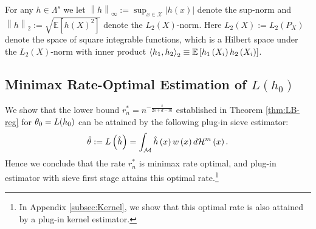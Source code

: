 \documentclass[12pt,american]{article}
\theoremstyle{definition}
\theoremstyle{plain}
\theoremstyle{definition}
\theoremstyle{plain}
\theoremstyle{plain}
\theoremstyle{plain}
\theoremstyle{plain}
\theoremstyle{plain}
\newcommand{\E}{\mathbb{E}}
\newcommand{\norm}[1]{\left\| #1 \right\|}
\begin{document}
For any $h\in\Lambda^s$ we let  $\norm{h}_{\infty}:=\sup_{x\in\mathcal{X}} |h(x)|$ denote the sup-norm and $\norm{h}_2:=\sqrt{\E[h(X)^2]}$ denote the $L_2(X)$-norm. Here $L_2(X):=L_2 (P_X )$ denote the space of square integrable functions, which is a Hilbert space under the $L_2(X)$-norm with inner product $\inprod{h_1,h_2}_2\equiv\E\left[h_1\left(X_{i}\right)h_2\left(X_{i}\right)\right]$.

\subsection{\label{subsec:Minimax_Lin-UB}Minimax Rate-Optimal Estimation of $L(h_0)$}

We show that the lower bound $r^*_{n}=n^{-\frac{s}{2s+d-m}}$ established in Theorem \ref{thm:LB-reg} for
$\theta_0=L(h_0)$ can be attained by the following plug-in sieve estimator:
\begin{equation}
  \hat{\theta}:=L\left(\hat{h}\right)=\int_{{\cal M}}\hat{h}\left(x\right)w\left(x\right)d{\cal H}^{m}\left(x\right).\label{eq:IntLevel_hhat}
\end{equation}
Hence we conclude that the rate $r^*_n$ is minimax rate optimal, and plug-in estimator with sieve first stage attains this optimal rate.\footnote{In Appendix \ref{subsec:Kernel}, we show that this optimal rate is also attained by a plug-in kernel estimator.}
\end{document}

